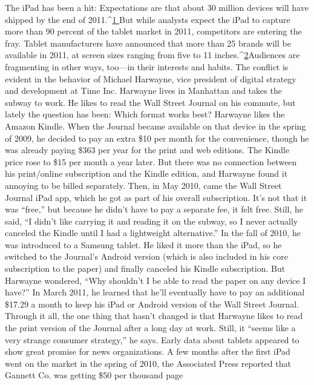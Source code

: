 The iPad has been a hit: Expectations are that about 30 million devices will
have shipped by the end of 2011.^{\href{#endnotes-ch4}{1 }}But while analysts expect the iPad to capture
more than 90 percent of the tablet market in 2011, competitors are entering
the fray. Tablet manufacturers have announced that more than 25 brands will be
available in 2011, at screen sizes ranging from five to 11 inches.^{\href{#endnotes-ch4}{2}}Audiences are fragmenting in other ways, too—in their interests and habits.
The conflict is evident in the behavior of Michael Harwayne, vice president of
digital strategy and development at Time Inc. Harwayne lives in Manhattan and
takes the subway to work. He likes to read the Wall Street Journal on his commute,
but lately the question has been: Which format works best?
Harwayne likes the Amazon Kindle. When the Journal became available on
that device in the spring of 2009, he decided to pay an extra \$10 per month for
the convenience, though he was already paying \$363 per year for the print and
web editions. The Kindle price rose to \$15 per month a year later.
But there was no connection between his print/online subscription and the
Kindle edition, and Harwayne found it annoying to be billed separately. Then,
in May 2010, came the Wall Street Journal iPad app, which he got as part of
his overall subscription. It’s not that it was ``free,'' but because he didn’t have
to pay a separate fee, it felt free. Still, he said, ``I didn’t like carrying it and
reading it on the subway, so I never actually canceled the Kindle until I had a
lightweight alternative.''
In the fall of 2010, he was introduced to a Samsung tablet. He liked it more
than the iPad, so he switched to the Journal’s Android version (which is also
included in his core subscription to the paper) and finally canceled his Kindle
subscription. But Harwayne wondered, ``Why shouldn’t I be able to read the
paper on any device I have?''
In March 2011, he learned that he’ll eventually have to pay an additional
\$17.29 a month to keep his iPad or Android version of the Wall Street Journal.
Through it all, the one thing that hasn’t changed is that Harwayne likes to read
the print version of the Journal after a long day at work. Still, it ``seems like a very
strange consumer strategy,'' he says.
Early data about tablets appeared to show great promise for news organizations.
A few months after the first iPad went on the market in the spring of 2010, the
Associated Press reported that Gannett Co. was getting \$50 per thousand page
